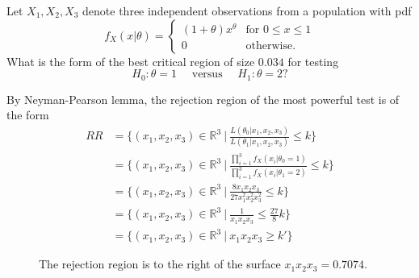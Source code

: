 \begin{example}
    Let $X_1, X_2, X_3$ denote three independent observations from a population with pdf
    \[
        f_X(x|\theta) = \begin{cases}
            (1 + \theta) x^{\theta} & \text{for } 0\leq x \leq 1\\
            0 & \text{otherwise}.
        \end{cases}
    \]
    What is the form of the best critical region of size $0.034$ for testing 
    \[
        H_0 : \theta = 1 \quad \text{ versus } \quad H_1 : \theta = 2?
    \]
\end{example}
\begin{solution}
    By Neyman-Pearson lemma, the rejection region of the most powerful test is of the form
    \begin{align*}
        RR &= \{ (x_1, x_2, x_3) \in \mathbb{R}^3 \> \bigg \vert \> \frac{L(\theta_0 | x_1, x_2, x_3)}{L(\theta_1 | x_1, x_2, x_3)} \leq k \}\\
        &= \{ (x_1, x_2, x_3) \in \mathbb{R}^3 \> \bigg \vert \> \frac{\prod_{i=1}^{3} f_X(x_i|\theta_0 = 1)}{\prod_{i=1}^{3} f_X(x_i|\theta_1 = 2)} \leq k \}\\
        &= \{ (x_1, x_2, x_3) \in \mathbb{R}^3 \> | \> \frac{8 x_1 x_2 x_3}{27 x^2_1 x^2_2 x^2_3} \leq k \}\\
        &= \{ (x_1, x_2, x_3) \in \mathbb{R}^3 \> | \> \frac{1}{x_1 x_2 x_3} \leq \frac{27}{8} k \}\\
        &= \{ (x_1, x_2, x_3) \in \mathbb{R}^3 \> | \> x_1 x_2 x_3 \geq k' \}
    \end{align*}
\end{solution}

\begin{figure}[ht]
    \centering
    \caption{The rejection region is to the right of the surface $x_1 x_2 x_3 = 0.7074$.}
\end{figure}

